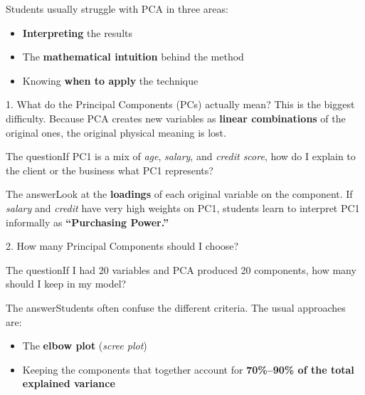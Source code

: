 \documentclass[aspectratio=43,11pt]{beamer}
\newcommand{\question}[1]{\begin{alertblock}{The question}#1\end{alertblock}}
\newcommand{\answer}[1]{\begin{exampleblock}{The answer}#1\end{exampleblock}}
\begin{document}
\begin{frame}{}
Students usually struggle with PCA in three areas:
\begin{itemize}
  \item \textbf{Interpreting} the results
  \item The \textbf{mathematical intuition} behind the method
  \item Knowing \textbf{when to apply} the technique
\end{itemize}
\end{frame}


\begin{frame}{1. What do the Principal Components (PCs) actually mean?}
This is the biggest difficulty. Because PCA creates new variables as
\textbf{linear combinations} of the original ones, the original physical
meaning is lost.

\question{If PC1 is a mix of \emph{age}, \emph{salary}, and \emph{credit score},
how do I explain to the client or the business what PC1 represents?}

\answer{Look at the \textbf{loadings} of each original variable on the component.
If \emph{salary} and \emph{credit} have very high weights on PC1, students learn
to interpret PC1 informally as \textbf{``Purchasing Power.''}}
\end{frame}


\begin{frame}{2. How many Principal Components should I choose?}
\question{If I had 20 variables and PCA produced 20 components,
how many should I keep in my model?}

\answer{Students often confuse the different criteria. The usual approaches are:
\begin{itemize}
  \item The \textbf{elbow plot} (\emph{scree plot})
  \item Keeping the components that together account for
        \textbf{70\%--90\% of the total explained variance}
\end{itemize}}
\end{frame}
\end{document}
